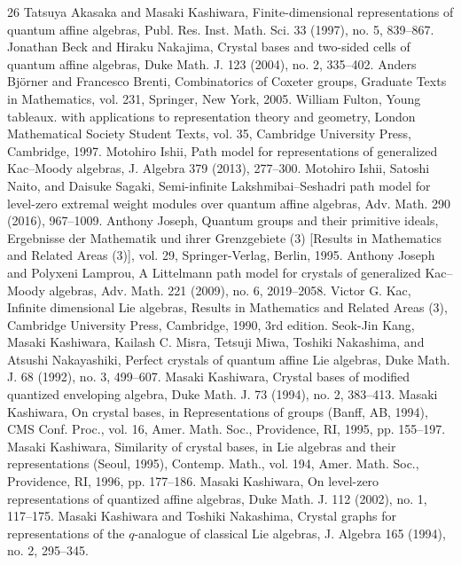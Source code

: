 \documentclass[10pt]{amsart}
\theoremstyle{definition}\newtheorem{defi}[theo]{Definition}
\theoremstyle{remark}\newtheorem{rema}[theo]{Remark}
\begin{document}
\begin{thebibliography}{26}
 Tatsuya Akasaka and Masaki Kashiwara, Finite-dimensional representations of quantum affine algebras, Publ. Res. Inst. Math. Sci. 33 (1997), no. 5, 839--867.
 Jonathan Beck and Hiraku Nakajima, Crystal bases and two-sided cells of quantum affine algebras, Duke Math. J. 123 (2004), no. 2, 335--402.
 Anders Björner and Francesco Brenti, Combinatorics of Coxeter groups, Graduate Texts in Mathematics, vol. 231, Springer, New York, 2005.
 William Fulton, Young tableaux. with applications to representation theory and geometry, London Mathematical Society Student Texts, vol. 35, Cambridge University Press, Cambridge, 1997.
 Motohiro Ishii, Path model for representations of generalized Kac--Moody algebras, J. Algebra 379 (2013), 277--300.
 Motohiro Ishii, Satoshi Naito, and Daisuke Sagaki, Semi-infinite Lakshmibai--Seshadri path model for level-zero extremal weight modules over quantum affine algebras, Adv. Math. 290 (2016), 967--1009.
 Anthony Joseph, Quantum groups and their primitive ideals, Ergebnisse der Mathematik und ihrer Grenzgebiete (3) [Results in Mathematics and Related Areas (3)], vol. 29, Springer-Verlag, Berlin, 1995.
 Anthony Joseph and Polyxeni Lamprou, A Littelmann path model for crystals of generalized Kac--Moody algebras, Adv. Math. 221 (2009), no. 6, 2019--2058.
 Victor G. Kac, Infinite dimensional Lie algebras, Results in Mathematics and Related Areas (3), Cambridge University Press, Cambridge, 1990, 3rd edition.
 Seok-Jin Kang, Masaki Kashiwara, Kailash C. Misra, Tetsuji Miwa, Toshiki Nakashima, and Atsushi Nakayashiki, Perfect crystals of quantum affine Lie algebras, Duke Math. J. 68 (1992), no. 3, 499--607.
 Masaki Kashiwara, Crystal bases of modified quantized enveloping algebra, Duke Math. J. 73 (1994), no. 2, 383--413.
 Masaki Kashiwara, On crystal bases, in Representations of groups (Banff, AB, 1994), CMS Conf. Proc., vol. 16, Amer. Math. Soc., Providence, RI, 1995, pp. 155--197.
 Masaki Kashiwara, Similarity of crystal bases, in Lie algebras and their representations (Seoul, 1995), Contemp. Math., vol. 194, Amer. Math. Soc., Providence, RI, 1996, pp. 177--186.
 Masaki Kashiwara, On level-zero representations of quantized affine algebras, Duke Math. J. 112 (2002), no. 1, 117--175.
 Masaki Kashiwara and Toshiki Nakashima, Crystal graphs for representations of the $q$-analogue of classical Lie algebras, J. Algebra 165 (1994), no. 2, 295--345.

\end{thebibliography}
\end{document}
